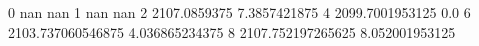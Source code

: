 0 nan nan
1 nan nan
2 2107.0859375 7.3857421875
4 2099.7001953125 0.0
6 2103.737060546875 4.036865234375
8 2107.752197265625 8.052001953125
